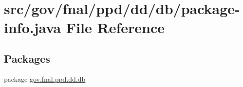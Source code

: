 \hypertarget{dd_2db_2package-info_8java}{\section{src/gov/fnal/ppd/dd/db/package-\/info.java File Reference}
\label{dd_2db_2package-info_8java}
}
\subsection*{Packages}
\begin{DoxyCompactItemize}
\item 
package \hyperlink{namespacegov_1_1fnal_1_1ppd_1_1dd_1_1db}{gov.\-fnal.\-ppd.\-dd.\-db}
\end{DoxyCompactItemize}
